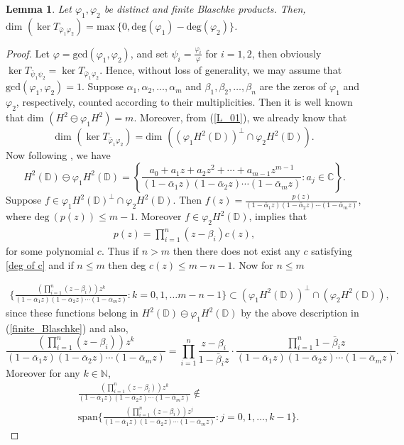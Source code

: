 \documentclass[12pt, a4 paper]{amsart}
\newcommand{\D}{\mathbb{D}}
\theoremstyle{definition}
\theoremstyle{plain}
\newtheorem{lem}[thm]{Lemma}
\theoremstyle{definition}
\numberwithin{equation}{section}
\let\phi=\varphi
\begin{document}
\begin{lem}\label{deg}
     Let $\phi_1,\phi_2$ be distinct and finite Blaschke products. Then, $\mbox{dim }(\ker T_{\bar\phi_1\phi_2})=\text{max}~\{0,\text{deg}(\phi_1)-\text{deg}(\phi_2)\}$.
     \end{lem}
     \begin{proof}
Let $\phi=\mbox{gcd}(\phi_1,\phi_2)$, and set $\psi_i=\tfrac{\phi_i}{\phi}$ for $i=1,2$, then obviously $\ker T_{\bar\psi_1\psi_2}=\ker T_{\bar\phi_1\phi_2}$. Hence, without loss of generality, we may assume that $\mbox{gcd}(\phi_1,\phi_2)=1$.
Suppose $\alpha_1,\alpha_2,\ldots,\alpha_m$ and $\beta_1,\beta_2,\ldots,\beta_n$ are the zeros of $\phi_1$ and $\phi_2$, respectively, counted according to their multiplicities. Then it is well known that dim $(H^2\ominus\phi_1H^2)=m$. Moreover, from (\ref{L_01}), we already know that
\[
\text{dim }(\ker T_{\bar\phi_1\phi_2})=
              \text{dim }((\phi_1 H^2(\D))^\perp \cap \phi_2H^2(\D)).
\]
         Now following \cite[ Corollary 5.18]{GMR}, we have 
             \begin{equation}\label{finite_Blaschke}
                 H^2(\mathbb{D})\ominus \phi_1 H^2(\mathbb{D})=\left\{\frac{a_0+a_1z+a_2z^2+\cdots+a_{m-1}z^{m-1}}{(1-\bar\alpha_1z)(1-\bar\alpha_2z)\cdots(1-\bar\alpha_mz)}:a_j\in\mathbb{C}\right\}.
             \end{equation}
            Suppose $f\in \phi_1 H^2(\D)^\perp\cap \phi_2H^2(\D)$. Then $f(z)=\frac{p(z)}{(1-\bar\alpha_1z)(1-\bar\alpha_2z)\cdots(1-\bar\alpha_mz)}$, where $\mbox{deg}~(p(z))\leq m- 1$. Moreover $f\in \phi_2H^2(\D)$, implies that \begin{align}\label{deg of c}
                p(z)=\prod_{i=1}^{n}(z-\beta_i)c(z),
            \end{align} 
            for some polynomial $c$. Thus if $n>m$ then there does not exist any $c$ satisfying \ref{deg of c} and if $n\leq m$ then deg $c(z)\leq m-n-1$.
            Now for $n\leq m$

            \begin{align*}
                \{\frac{\left(\prod_{i=1}^{n}(z-\beta_i)\right)z^k}{(1-\bar\alpha_1z)(1-\bar\alpha_2z)\cdots(1-\bar\alpha_mz)}:k=0,1,\ldots m-n-1\}\subset (\phi_1 H^2(\D))^\perp\cap(\phi_2 H^2(\D)),
            \end{align*}
since these functions belong in $H^2(\D) \ominus \phi_1 H^2(\D)$ by the above description in (\ref{finite_Blaschke}) and also,
\[
\frac{\left(\prod_{i=1}^{n}(z-\beta_i)\right)z^k}{(1-\bar\alpha_1z)(1-\bar\alpha_2z)\cdots(1-\bar\alpha_mz)} = \prod_{i=1}^n \frac{z-\beta_i}{1 - \bar \beta_i z} \, \boldsymbol{\cdot} \, \frac{\prod_{i=1}^{n}{1 - \bar \beta_i z}}{(1-\bar\alpha_1z)(1-\bar\alpha_2z)\cdots(1-\bar\alpha_mz)}.
\]
Moreover for any $k \in \mathbb{N}$,
 \begin{align*}
                &\frac{\left(\prod_{i=1}^{n}(z-\beta_i)\right)z^{k}}{(1-\bar\alpha_1z)(1-\bar\alpha_2z)\cdots(1-\bar\alpha_mz)}\notin \\
                &\text{span}\{\frac{\left(\prod_{i=1}^{n}(z-\beta_i)\right)z^j}{(1-\bar\alpha_1z)(1-\bar\alpha_2z)\cdots(1-\bar\alpha_mz)}:j=0,1,\ldots,k-1\}.
            \end{align*}
            

\end{proof}
\end{document}
